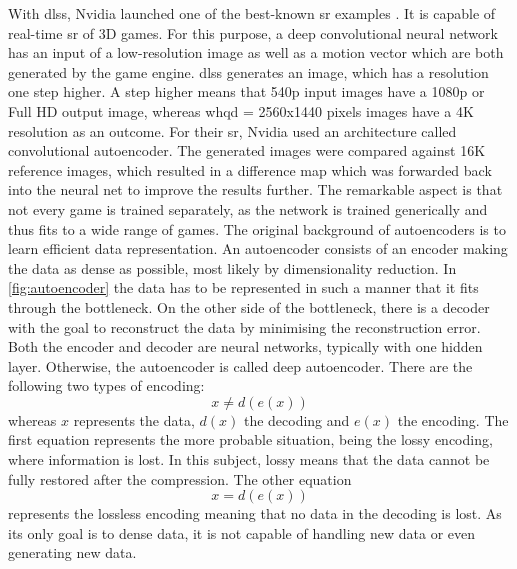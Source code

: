 \par
With \gls{dlss}, Nvidia launched one of the best-known \gls{sr} examples \parencite{DLSS2020}. It is capable of real-time \gls{sr} of 3D games. For this purpose, a deep convolutional neural network has an input of a low-resolution image as well as a motion vector which are both generated by the game engine. \gls{dlss} generates an image, which has a resolution one step higher. A step higher means that 540p input images have a 1080p or Full HD output image, whereas \gls{whqd} = 2560x1440 pixels images have a 4K resolution as an outcome. For their \gls{sr}, Nvidia used an architecture called convolutional autoencoder. The generated images were compared against 16K reference images, which resulted in a difference map which was forwarded back into the neural net to improve the results further. The remarkable aspect is that not every game is trained separately, as the network is trained generically and thus fits to a wide range of games. The original background of autoencoders is to learn efficient data representation. An autoencoder consists of an encoder making the data as dense as possible, most likely by dimensionality reduction. In \autoref{fig:autoencoder} the data has to be represented in such a manner that it fits through the bottleneck. On the other side of the bottleneck, there is a decoder with the goal to reconstruct the data by minimising the reconstruction error. Both the encoder and decoder are neural networks, typically with one hidden layer. Otherwise, the autoencoder is called deep autoencoder. There are the following two types of encoding:
\[x \neq d(e(x)) \]
whereas \(x\) represents the data, \(d(x)\) the decoding and \(e(x)\) the encoding.
The first equation represents the more probable situation, being the lossy encoding, where information is lost. In this subject, lossy means that the data cannot be fully restored after the compression. The other equation
\[x = d(e(x)) \]
represents the lossless encoding meaning that no data in the decoding is lost. As its only goal is to dense data, it is not capable of handling new data or even generating new data.

